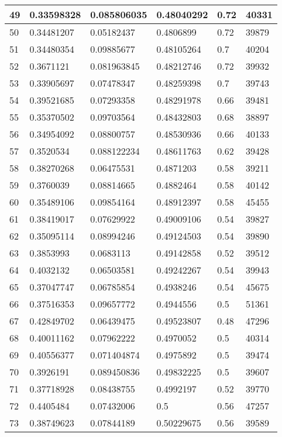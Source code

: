 \begin{longtable}{|l|l|l|l|l|l|}
49 & 0.33598328 & 0.085806035 & 0.48040292 & 0.72 & 40331 \\ \hline 
50 & 0.34481207 & 0.05182437 & 0.4806899 & 0.72 & 39879 \\ \hline 
51 & 0.34480354 & 0.09885677 & 0.48105264 & 0.7 & 40204 \\ \hline 
52 & 0.3671121 & 0.081963845 & 0.48212746 & 0.72 & 39932 \\ \hline 
53 & 0.33905697 & 0.07478347 & 0.48259398 & 0.7 & 39743 \\ \hline 
54 & 0.39521685 & 0.07293358 & 0.48291978 & 0.66 & 39481 \\ \hline 
55 & 0.35370502 & 0.09703564 & 0.48432803 & 0.68 & 38897 \\ \hline 
56 & 0.34954092 & 0.08800757 & 0.48530936 & 0.66 & 40133 \\ \hline 
57 & 0.3520534 & 0.088122234 & 0.48611763 & 0.62 & 39428 \\ \hline 
58 & 0.38270268 & 0.06475531 & 0.4871203 & 0.58 & 39211 \\ \hline 
59 & 0.3760039 & 0.08814665 & 0.4882464 & 0.58 & 40142 \\ \hline 
60 & 0.35489106 & 0.09854164 & 0.48912397 & 0.58 & 45455 \\ \hline 
61 & 0.38419017 & 0.07629922 & 0.49009106 & 0.54 & 39827 \\ \hline 
62 & 0.35095114 & 0.08994246 & 0.49124503 & 0.54 & 39890 \\ \hline 
63 & 0.3853993 & 0.0683113 & 0.49142858 & 0.52 & 39512 \\ \hline 
64 & 0.4032132 & 0.06503581 & 0.49242267 & 0.54 & 39943 \\ \hline 
65 & 0.37047747 & 0.06785854 & 0.4938246 & 0.54 & 45675 \\ \hline 
66 & 0.37516353 & 0.09657772 & 0.4944556 & 0.5 & 51361 \\ \hline 
67 & 0.42849702 & 0.06439475 & 0.49523807 & 0.48 & 47296 \\ \hline 
68 & 0.40011162 & 0.07962222 & 0.4970052 & 0.5 & 40314 \\ \hline 
69 & 0.40556377 & 0.071404874 & 0.4975892 & 0.5 & 39474 \\ \hline 
70 & 0.3926191 & 0.089450836 & 0.49832225 & 0.5 & 39607 \\ \hline 
71 & 0.37718928 & 0.08438755 & 0.4992197 & 0.52 & 39770 \\ \hline 
72 & 0.4405484 & 0.07432006 & 0.5 & 0.56 & 47257 \\ \hline 
73 & 0.38749623 & 0.07844189 & 0.50229675 & 0.56 & 39589 \\ \hline 

\end{longtable}
